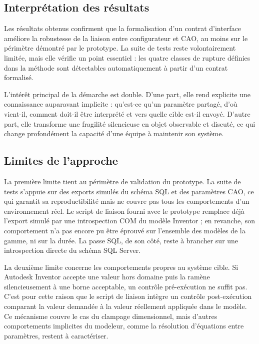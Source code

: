 \subsection{Interprétation des résultats}

Les résultats obtenus confirment que la formalisation d'un contrat d'interface améliore la robustesse de la liaison entre configurateur et CAO, au moins sur le périmètre démontré par le prototype. La suite de tests reste volontairement limitée, mais elle vérifie un point essentiel : les quatre classes de rupture définies dans la méthode sont détectables automatiquement à partir d'un contrat formalisé.

L'intérêt principal de la démarche est double. D'une part, elle rend explicite une connaissance auparavant implicite : qu'est-ce qu'un paramètre partagé, d'où vient-il, comment doit-il être interprété et vers quelle cible est-il envoyé. D'autre part, elle transforme une fragilité silencieuse en objet observable et discuté, ce qui change profondément la capacité d'une équipe à maintenir son système.

\subsection{Limites de l'approche}

La première limite tient au périmètre de validation du prototype. La suite de tests s'appuie sur des exports simulés du schéma SQL et des paramètres CAO, ce qui garantit sa reproductibilité mais ne couvre pas tous les comportements d'un environnement réel. Le script de liaison fourni avec le prototype remplace déjà l'export simulé par une introspection COM du modèle Inventor ; en revanche, son comportement n'a pas encore pu être éprouvé sur l'ensemble des modèles de la gamme, ni sur la durée. La passe SQL, de son côté, reste à brancher sur une introspection directe du schéma SQL Server.

La deuxième limite concerne les comportements propres au système cible. Si Autodesk Inventor accepte une valeur hors domaine puis la ramène silencieusement à une borne acceptable, un contrôle pré-exécution ne suffit pas. C'est pour cette raison que le script de liaison intègre un contrôle post-exécution comparant la valeur demandée à la valeur réellement appliquée dans le modèle. Ce mécanisme couvre le cas du clampage dimensionnel, mais d'autres comportements implicites du modeleur, comme la résolution d'équations entre paramètres, restent à caractériser.

